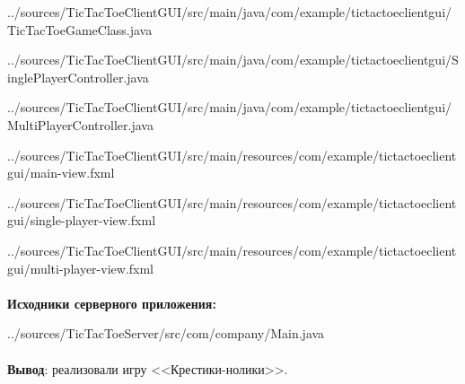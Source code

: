 \documentclass[12pt, a4paper, simple]{eskdtext}
\begin{document}
    
    {../sources/TicTacToeClientGUI/src/main/java/com/example/tictactoeclientgui/TicTacToeGameClass.java}

    
    {../sources/TicTacToeClientGUI/src/main/java/com/example/tictactoeclientgui/SinglePlayerController.java}

    
    {../sources/TicTacToeClientGUI/src/main/java/com/example/tictactoeclientgui/MultiPlayerController.java}

    
    {../sources/TicTacToeClientGUI/src/main/resources/com/example/tictactoeclientgui/main-view.fxml}

    
    {../sources/TicTacToeClientGUI/src/main/resources/com/example/tictactoeclientgui/single-player-view.fxml}

    
    {../sources/TicTacToeClientGUI/src/main/resources/com/example/tictactoeclientgui/multi-player-view.fxml}

    \paragraph{}\textbf{Исходники серверного приложения:}

    
    {../sources/TicTacToeServer/src/com/company/Main.java}


    \paragraph{} \textbf{Вывод}: реализовали игру <<Крестики-нолики>>.

\end{document}
